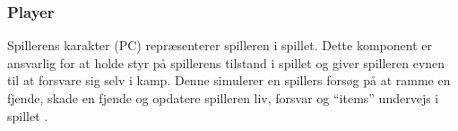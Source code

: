 \subsubsection{Player}
Spillerens karakter (PC) repræsenterer spilleren i spillet. Dette komponent er ansvarlig for at
holde styr på spillerens tilstand i spillet og giver spilleren evnen til at forsvare
sig selv i kamp. Denne simulerer en spillers forsøg på at ramme en fjende, skade en 
fjende og opdatere spilleren liv, forsvar og ``items'' undervejs i spillet 
\parencite[Section 8.3.2][]{TekniskBilag}.


\newpage

